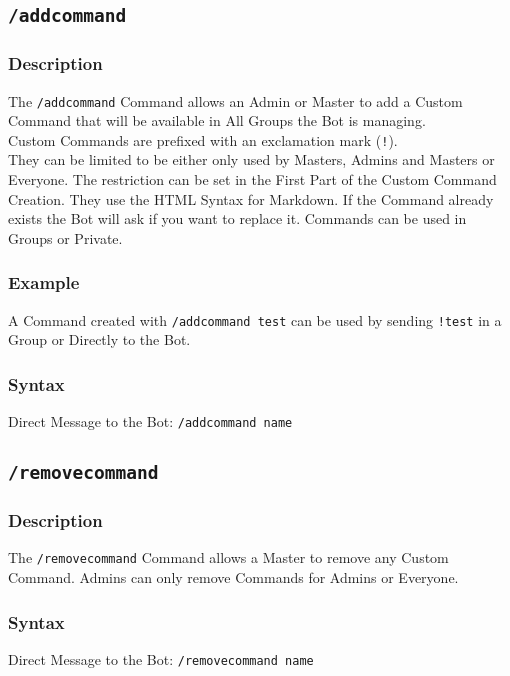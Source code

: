 \documentclass[a4paper]{article}
\begin{document}
    \subsection{\texttt{/addcommand}}
        \subsubsection*{Description}
            The \texttt{/addcommand} Command allows an Admin or Master to add a Custom Command that will be available in All Groups the Bot is managing. \\
            Custom Commands are prefixed with an exclamation mark (\texttt{!}).\\
            They can be limited to be either only used by Masters, Admins and Masters or Everyone. The restriction can be set in the First Part of the Custom Command Creation. They use the HTML Syntax for Markdown. If the Command already exists the Bot will ask if you want to replace it. Commands can be used in Groups or Private.

        \subsubsection*{Example}
            A Command created with \texttt{/addcommand test} can be used by sending \texttt{!test} in a Group or Directly to the Bot.

        \subsubsection*{Syntax}
            Direct Message to the Bot: \texttt{/addcommand name}\\


    \subsection{\texttt{/removecommand}}
        \subsubsection*{Description}
            The \texttt{/removecommand} Command allows a Master to remove any Custom Command. Admins can only remove Commands for Admins or Everyone.

        \subsubsection*{Syntax}
            Direct Message to the Bot: \texttt{/removecommand name}\\
\end{document}
